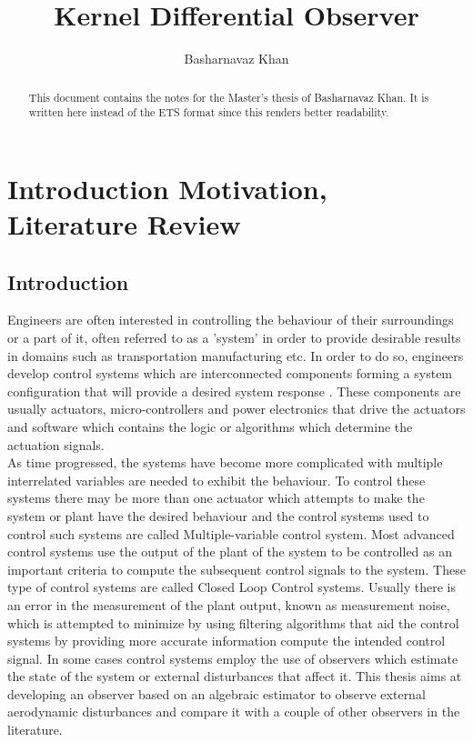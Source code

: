 \documentclass{article}
\begin{document}
\title{Kernel Differential Observer}
\author{Basharnavaz Khan}
\maketitle

\begin{abstract}
This document contains the notes for the Master's thesis of Basharnavaz Khan. It is written here instead of the ETS format since this renders better readability.
\end{abstract}

\tableofcontents
\section{Introduction Motivation, Literature Review}
\subsection{Introduction}
Engineers are often interested in controlling the behaviour of their surroundings or a part of it, often referred to as a 'system' in order to provide desirable results in domains such as transportation manufacturing etc. In order to do so, engineers develop control systems which are interconnected components forming a system configuration that will provide a desired system response \cite{dorf_control_book}. These components are usually actuators, micro-controllers and power electronics that drive the actuators and software which contains the logic or algorithms which determine the actuation signals. \\As time progressed, the systems have become more complicated with multiple interrelated variables are needed to exhibit the behaviour. To control these systems there may be more than one actuator which attempts to make the system or plant have the desired behaviour and the control systems used to control such systems are called Multiple-variable control system. Most advanced control systems use the output of the plant of the system to be controlled as an important criteria to compute the subsequent control signals to the system. These type of control systems are called Closed Loop Control systems. Usually there is an error in the measurement of the plant output, known as measurement noise, which is attempted to minimize by using filtering algorithms that aid the control systems by providing more accurate information compute the intended control signal. In some cases control systems employ the use of observers which estimate the state of the system or external disturbances that affect it. This thesis aims at developing an observer based on an algebraic estimator to observe external aerodynamic disturbances and compare it with a couple of other observers in the literature. 
\end{document}
